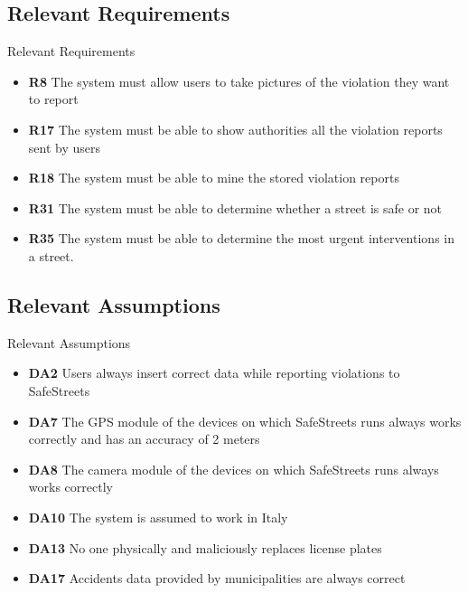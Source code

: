 	\subsection{Relevant Requirements}
		\begin{frame}{Relevant Requirements}
			\begin{itemize}
				\item <1-> \textbf{R8} The system must allow users to take pictures of the violation they want to report
				
				\item <2-> \textbf{R17} The system must be able to show authorities all the violation reports sent by users
				
				\item <3-> \textbf{R18} The system must be able to mine the stored violation reports
				
				\item <4-> \textbf{R31} The system must be able to determine whether a street is safe or not
				
				\item <5-> \textbf{R35} The system must be able to determine the most urgent interventions in a street.
			\end{itemize}
		\end{frame}
	
	\subsection{Relevant Assumptions}
		\begin{frame}{Relevant Assumptions}
			\begin{itemize}
				\item <1-> \textbf{DA2} Users always insert correct data while reporting violations to SafeStreets
				
				\item <2-> \textbf{DA7} The GPS module of the devices on which SafeStreets runs always works correctly and has an accuracy of 2 meters
				
				\item <3-> \textbf{DA8} The camera module of the devices on which SafeStreets runs always works correctly
				
				\item <4-> \textbf{DA10} The system is assumed to work in Italy
				
				\item <5-> \textbf{DA13} No one physically and maliciously replaces license plates
				
				\item <6-> \textbf{DA17} Accidents data provided by municipalities are always correct
			\end{itemize}
		\end{frame}

